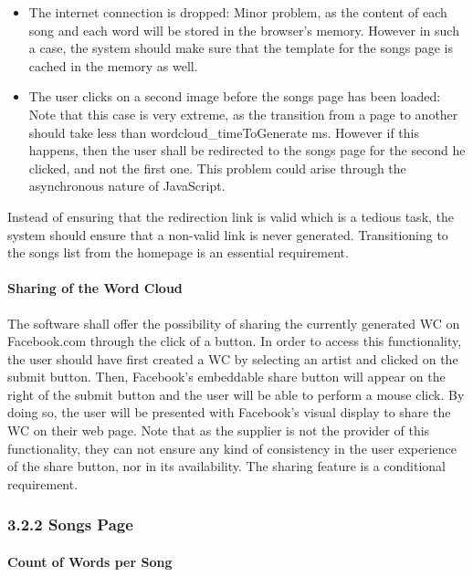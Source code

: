 \documentclass[]{article}
\begin{document}
\begin{itemize}
\itemsep1pt\parskip0pt
\item
  The internet connection is dropped: Minor problem, as the content of
  each song and each word will be stored in the browser's memory.
  However in such a case, the system should make sure that the template
  for the songs page is cached in the memory as well.
\item
  The user clicks on a second image before the songs page has been
  loaded: Note that this case is very extreme, as the transition from a
  page to another should take less than wordcloud\_timeToGenerate ms.
  However if this happens, then the user shall be redirected to the
  songs page for the second he clicked, and not the first one. This
  problem could arise through the asynchronous nature of JavaScript.
\end{itemize}

Instead of ensuring that the redirection link is valid which is a
tedious task, the system should ensure that a non-valid link is never
generated. Transitioning to the songs list from the homepage is an
essential requirement.

\paragraph{Sharing of the Word Cloud}\label{sharing-of-the-word-cloud}

The software shall offer the possibility of sharing the currently
generated WC on Facebook.com through the click of a button. In order to
access this functionality, the user should have first created a WC by
selecting an artist and clicked on the submit button. Then, Facebook's
embeddable share button will appear on the right of the submit button
and the user will be able to perform a mouse click. By doing so, the
user will be presented with Facebook's visual display to share the WC on
their web page. Note that as the supplier is not the provider of this
functionality, they can not ensure any kind of consistency in the user
experience of the share button, nor in its availability. The sharing
feature is a conditional requirement.

\subsubsection{3.2.2 Songs Page}\label{songs-page}

\paragraph{Count of Words per Song}\label{count-of-words-per-song}
\end{document}
